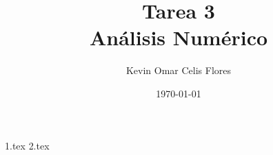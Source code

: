 \documentclass[spanish, oneside]{article}
\title{Tarea 3\\Análisis Numérico}
\author{Kevin Omar Celis Flores}
\date{\today}
\begin{document}
\maketitle
{1.tex}
{2.tex}
\end{document}
